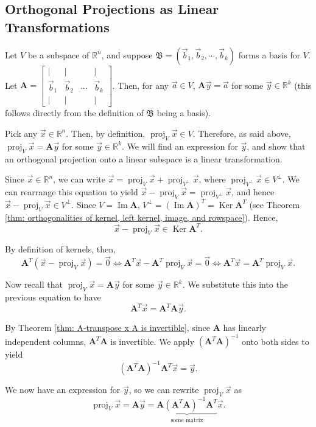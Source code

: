 \documentclass[]{book}
\DeclareMathOperator{\proj}{proj}
\DeclareMathOperator{\image}{Im}
\DeclareMathOperator{\kernel}{Ker}
\newcommand{\bas}[1]{\ensuremath{\mathfrak{#1}}}
\newcommand{\mat}[1]{\ensuremath{\mathbf{#1}}}
\newcommand{\R}{\ensuremath{\mathbb{R}}}
\begin{document}
\subsection{Orthogonal Projections as Linear Transformations}
Let $V$ be a subspace of $\R^n$, and suppose $\bas{B} = (\vec{b}_1,\vec{b}_2,\cdots,\vec{b}_k)$ forms a basis for $V$. Let $\mat{A} = \begin{bmatrix}\vert & \vert && \vert \\ \vec{b}_1 & \vec{b}_2 & \cdots & \vec{b}_k \\ \vert & \vert & & \vert\end{bmatrix}$. Then, for any $\vec{a} \in V$, $\mat{A}\vec{y} = \vec{a}$ for some $\vec{y} \in \R^k$ (this follows directly from the definition of $\bas{B}$ being a basis).

Pick any $\vec{x} \in \R^n$. Then, by definition, $\proj_V \vec{x} \in V$. Therefore, as said above, $\proj_V \vec{x} = \mat{A}\vec{y}$ for some $\vec{y} \in \R^k$. We will find an expression for $\vec{y}$, and show that an orthogonal projection onto a linear subspace is a linear transformation.

Since $\vec{x} \in \R^n$, we can write $\vec{x} = \proj_V \vec{x} + \proj_{V^{\perp}} \vec{x}$, where $ \proj_{V^{\perp}} \vec{x} \in V^{\perp}$. We can rearrange this equation to yield $\vec{x} - \proj_V \vec{x} = \proj_{V^{\perp}}\vec{x}$, and hence $\vec{x} - \proj_V \vec{x} \in V^{\perp}$. Since $V = \image\mat{A}$, $V^{\perp} = \left(\image\mat{A}\right)^T = \kernel\mat{A}^T$ (see Theorem \ref{thm: orthogonalities of kernel, left kernel, image, and rowspace}). Hence, \[\vec{x} - \proj_V \vec{x} \in \kernel\mat{A}^T.\]

By definition of kernels, then,
\[\mat{A}^T\left(\vec{x} - \proj_V \vec{x}\right) = \vec{0} \Longleftrightarrow \mat{A}^T\vec{x} - \mat{A}^T\proj_V \vec{x} = \vec{0} \Longleftrightarrow \mat{A}^T\vec{x} = \mat{A}^T\proj_V\vec{x}.\]

Now recall that $\proj_V \vec{x} = \mat{A}\vec{y}$ for some $\vec{y} \in \R^k$. We substitute this into the previous equation to have
\[\mat{A}^T\vec{x} = \mat{A}^T\mat{A}\vec{y}.\]

By Theorem \ref{thm: A-transpose x A is invertible}, since $\mat{A}$ has linearly independent columns, $\mat{A}^T\mat{A}$ is invertible. We apply $\left(\mat{A}^T\mat{A}\right)^{-1}$ onto both sides to yield
\[\left(\mat{A}^T\mat{A}\right)^{-1}\mat{A}^T\vec{x} = \vec{y}.\]

We now have an expression for $\vec{y}$, so we can rewrite $\proj_V \vec{x}$ as
\[\proj_V \vec{x} = \mat{A}\vec{y} = \underbrace{\mat{A}\left(\mat{A}^T\mat{A}\right)^{-1}\mat{A}^T}_{\text{some matrix}}\vec{x}.\]
\end{document}
